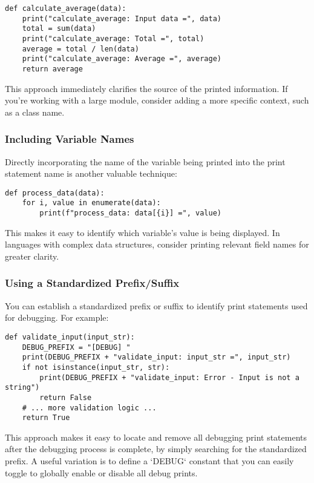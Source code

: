 \documentclass{article}
\begin{document}
{{{\begin{verbatim}
def calculate_average(data):
    print("calculate_average: Input data =", data)
    total = sum(data)
    print("calculate_average: Total =", total)
    average = total / len(data)
    print("calculate_average: Average =", average)
    return average
\end{verbatim}

This approach immediately clarifies the source of the printed information. If you’re working with a large module, consider adding a more specific context, such as a class name.

\subsubsection*{Including Variable Names}

Directly incorporating the name of the variable being printed into the print statement name is another valuable technique:

\begin{verbatim}
def process_data(data):
    for i, value in enumerate(data):
        print(f"process_data: data[{i}] =", value)
\end{verbatim}

This makes it easy to identify which variable's value is being displayed. In languages with complex data structures, consider printing relevant field names for greater clarity.

\subsubsection*{Using a Standardized Prefix/Suffix}

You can establish a standardized prefix or suffix to identify print statements used for debugging. For example:

\begin{verbatim}
def validate_input(input_str):
    DEBUG_PREFIX = "[DEBUG] "
    print(DEBUG_PREFIX + "validate_input: input_str =", input_str)
    if not isinstance(input_str, str):
        print(DEBUG_PREFIX + "validate_input: Error - Input is not a string")
        return False
    # ... more validation logic ...
    return True
\end{verbatim}

This approach makes it easy to locate and remove all debugging print statements after the debugging process is complete, by simply searching for the standardized prefix.  A useful variation is to define a `DEBUG` constant that you can easily toggle to globally enable or disable all debug prints.

}}}
\end{document}
